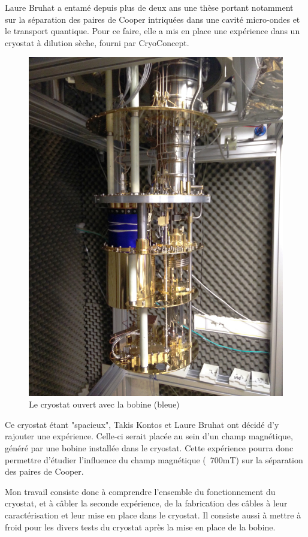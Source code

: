 
Laure Bruhat a entamé depuis plus de deux ans une thèse portant notamment sur la séparation des paires de Cooper intriquées dans une cavité micro-ondes et le transport quantique. Pour ce faire, elle a mis en place une expérience dans un cryostat à dilution sèche, fourni par CryoConcept.
\newline
\begin{figure}[h]
    \begin{center}
        \includegraphics[height=0.7\textwidth]{Images/Global.jpg}
        \caption*{Le cryostat ouvert avec la bobine (bleue)}
        \label{photo_separateur_nanotube}
    \end{center}
\end{figure}


Ce cryostat étant "spacieux", Takis Kontos et Laure Bruhat ont décidé d'y rajouter une expérience. Celle-ci serait placée au sein d'un champ magnétique, généré par une bobine installée dans le cryostat. Cette expérience pourra donc permettre d'étudier l'influence du champ magnétique (~700mT) sur la séparation des paires de Cooper.
\newline

Mon travail consiste donc à comprendre l'ensemble du fonctionnement du cryostat, et à câbler la seconde expérience, de la fabrication des câbles à leur caractérisation et leur mise en place dans le cryostat. Il consiste aussi à mettre à froid pour les divers tests du cryostat après la mise en place de la bobine.

